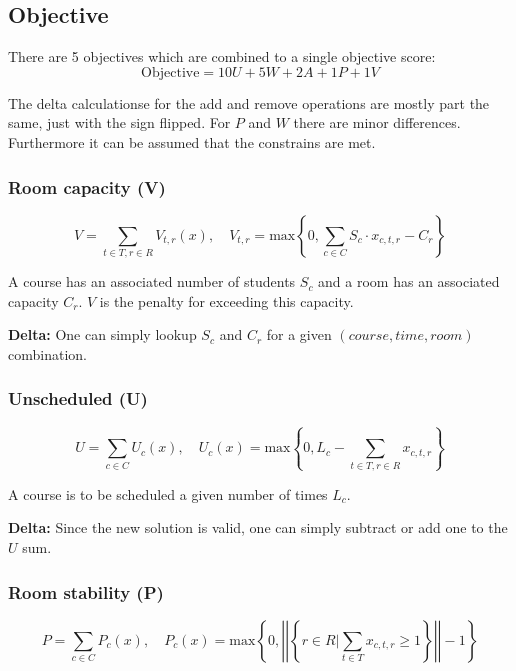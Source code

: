 \subsection{Objective}
\label{sec:problem-objective}

There are 5 objectives which are combined to a single objective score:
\begin{equation}
\mathrm{Objective} = 10 U + 5 W + 2 A + 1 P + 1 V
\end{equation}

The delta calculationse for the add and remove operations are mostly part the same, just with the sign flipped. For $P$ and $W$ there are minor differences. Furthermore it can be assumed that the constrains are met.

\subsubsection{Room capacity (V)}
\begin{equation}
V = \sum_{t \in T, r \in R} V_{t, r}(x), \quad V_{t, r} = \mathrm{max}\left\{ 0, \sum_{c \in C} S_c \cdot x_{c, t, r} - C_r \right\}
\end{equation}

A course has an associated number of students $S_c$ and a room has an associated capacity $C_r$. $V$ is the penalty for exceeding this capacity.

\textbf{Delta: } One can simply lookup $S_c$ and $C_r$ for a given $(course, time, room)$ combination.

\subsubsection{Unscheduled (U)}
\begin{equation}
U = \sum_{c \in C} U_c(x), \quad U_c(x) = \mathrm{max}\left\{ 0, L_c - \sum_{t \in T, r \in R} x_{c, t, r}\right\}
\end{equation}

A course is to be scheduled a given number of times $L_c$.

\textbf{Delta: } Since the new solution is valid, one can simply subtract or add one to the $U$ sum.

\subsubsection{Room stability (P)}
\begin{equation}
P = \sum_{c \in C} P_c(x), \quad P_c(x) = \mathrm{max}\left\{ 0, \left|\left| \left\{ r \in R \Big\vert \sum_{t \in T} x_{c, t, r} \ge 1 \right\} \right|\right| - 1 \right\}
\end{equation}

